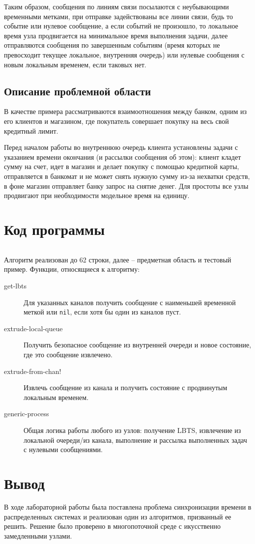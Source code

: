 \documentclass[12pt, a4paper]{article}
\begin{document}
Таким образом, сообщения по линиям связи посылаются с неубывающими
временными метками, при отправке задействованы все линии связи,
будь то событие или нулевое сообщение, а если событий не произошло,
то локальное время узла продвигается на минимальное время выполнения
задачи, далее отправляются сообщения по завершенным событиям (время
которых не превосходит текущее локальное, внутренняя очередь) или
нулевые сообщения с новым локальным временем, если таковых нет.

\subsection{Описание проблемной области}
В качестве примера рассматриваются взаимоотношения между
банком, одним из его клиентов и магазином, где покупатель
совершает покупку на весь свой кредитный лимит.

Перед началом работы во внутреннюю очередь клиента установлены
задачи с указанием времени окончания (и рассылки сообщения об этом):
клиент кладет сумму на счет, идет в магазин и делает покупку
с помощью кредитной карты, отправляется в банкомат и не может
снять нужную сумму из-за нехватки средств, в фоне магазин отправляет
банку запрос на снятие денег. Для простоты все узлы продвигают
при необходимости модельное время на единицу.

\section{Код программы}
\inputminted{clojure}{core.clj}

Алгоритм реализован до 62 строки, далее -- предметная область
и тестовый пример. Функции, относящиеся к алгоритму:
\begin{description}
\item[get-lbts] Для указанных каналов получить сообщение
  с наименьшей временной меткой или \texttt{nil}, если
  хотя бы один из каналов пуст.
\item[extrude-local-queue]Получить безопасное сообщение
  из внутренней очереди и новое состояние, где это сообщение
  извлечено.
\item[extrude-from-chan!]Извлечь сообщение из канала и
  получить состояние с продвинутым локальным временем.
\item[generic-process]Общая логика работы любого из узлов:
  получение LBTS, извлечение из локальной очереди/из канала,
  выполнение и рассылка выполненных задач с нулевыми
  сообщениями.

\end{description}

\section{Вывод}
В ходе лабораторной работы была поставлена проблема
синхронизации времени в распределенных системах и реализован
один из алгоритмов, призванный ее решить. Решение было проверено
в многопоточной среде с икусственно замедленными узлами.
\end{document}
